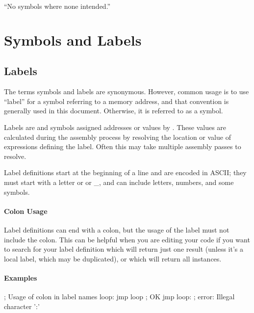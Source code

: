 \begin{savequote}
\sffamily
``No symbols where none intended.''
\end{savequote}

\chapter{Symbols and Labels}

\section{Labels}


The terms symbols and labels are synonymous. However, common usage is to use ``label'' for a symbol referring to a memory address, and that convention is generally used in this document. Otherwise, it is referred to as a symbol.

Labels are and symbols assigned addresses or values by \dasm. These values are calculated during the assembly process by resolving the location or value of expressions defining the label. Often this may take multiple assembly passes to resolve.

Label definitions start at the beginning of a line and are encoded in ASCII; they must start with a letter or  or {\_}, and can include letters, numbers, and some symbols.




\label{changelog:20200823colon}
\subsubsection{Colon Usage}
Label definitions can end with a colon, but the usage of the label must not include the colon. This can be helpful when you are editing your code if you want to search for your label definition  which will return just one result (unless it's a local label, which may be duplicated), or  which will return all instances.

\subsubsection{Examples}
\begin{code}
; Usage of colon in label names
loop:       jmp loop    ; OK
            jmp loop:   ; error: Illegal character ':'
\end{code}


